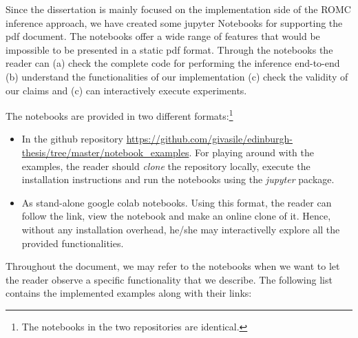Since the dissertation is mainly focused on the implementation side of
the ROMC inference approach, we have created some jupyter Notebooks
for supporting the pdf document. The notebooks offer a wide range of
features that would be impossible to be presented in a static pdf
format. Through the notebooks the reader can (a) check the complete
code for performing the inference end-to-end (b) understand the
functionalities of our implementation (c) check the validity of our
claims and (c) can interactively execute experiments.

The notebooks are provided in two different formats:\footnote{The
  notebooks in the two repositories are identical.}

\begin{itemize}
\item In the github repository
  \href{https://github.com/givasile/edinburgh-thesis/tree/master/notebook_examples}{https://github.com/givasile/edinburgh-thesis/tree/master/notebook_examples}. For
  playing around with the examples, the reader should \textit{clone} the
  repository locally, execute the installation instructions and run the
  notebooks using the \textit{jupyter} package.
\item As stand-alone google colab notebooks. Using this format, the
  reader can follow the link, view the notebook and make an online
  clone of it. Hence, without any installation overhead, he/she may
  interactivelly explore all the provided functionalities.
\end{itemize}


Throughout the document, we may refer to the notebooks when we want to
let the reader observe a specific functionality that we describe. The
following list contains the implemented examples along with their
links:

